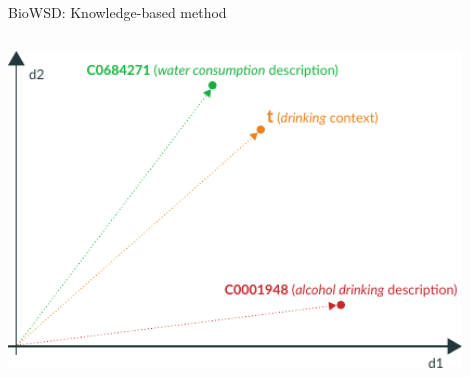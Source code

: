 \begin{frame}[t]{BioWSD: Knowledge-based method}
\begin{columns}[t,totalwidth=\textwidth]
\begin{column}{0.60\textwidth}
\RaggedLeft
\vspace*{2mm}
\includegraphics[width=0.90\textwidth]{img/wsd-example/v5/001.pdf}%

\end{column}

\end{columns}

\end{frame}
